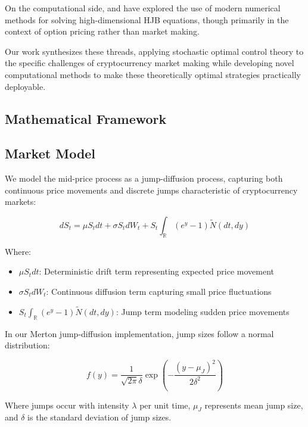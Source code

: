\documentclass[twocolumn,11pt]{IEEEtran}  %
\begin{document}
On the computational side, \cite{reisinger2018numerical} and \cite{sirignano2019deep} have explored the use of modern numerical methods for solving high-dimensional HJB equations, though primarily in the context of option pricing rather than market making.

Our work synthesizes these threads, applying stochastic optimal control theory to the specific challenges of cryptocurrency market making while developing novel computational methods to make these theoretically optimal strategies practically deployable.

\begin{onecolumn}
    
\section{Mathematical Framework}

\subsection{Market Model}

We model the mid-price process as a jump-diffusion process, capturing both continuous price movements and discrete jumps characteristic of cryptocurrency markets:

\begin{equation}
dS_t = \mu S_t dt + \sigma S_t dW_t + S_t \int_{\mathbb{R}} (e^y - 1) \tilde{N}(dt, dy)
\end{equation}

Where:
\begin{itemize}
    \item $\mu S_t dt$: Deterministic drift term representing expected price movement
    \item $\sigma S_t dW_t$: Continuous diffusion term capturing small price fluctuations
    \item $S_t \int_{\mathbb{R}} (e^y - 1) \tilde{N}(dt, dy)$: Jump term modeling sudden price movements
\end{itemize}

In our Merton jump-diffusion implementation, jump sizes follow a normal distribution:

\begin{equation}
f(y) = \frac{1}{\sqrt{2\pi}\delta} \exp\left(-\frac{(y-\mu_J)^2}{2\delta^2}\right)
\end{equation}

Where jumps occur with intensity $\lambda$ per unit time, $\mu_J$ represents mean jump size, and $\delta$ is the standard deviation of jump sizes.


\end{onecolumn}
\end{document}
